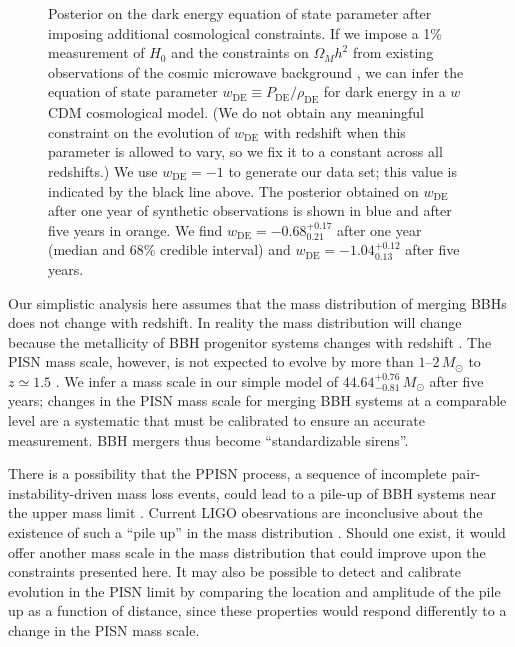 \documentclass[modern]{aastex62}
\newcommand{\wDE}{w_\mathrm{DE}}
\newcommand{\MScaleFiveYear}{44.64^{+0.76}_{-0.81} \, \MSun{}}
\newcommand{\wDEOneYear}{-0.68^{+0.17}_{0.21}}
\newcommand{\wDEFiveYear}{-1.04^{+0.12}_{0.13}}
\newcommand{\MSun}{M_\odot}
\begin{document}
\begin{figure}
%
  \caption{\label{fig:wDE} Posterior on the dark energy equation of state
  parameter after imposing additional cosmological constraints.  If we impose a
  1\% measurement of $H_0$ \citep{Chen2017,Mortlock2018,2018PhRvD..98h3523D} and the constraints on
  $\Omega_M h^2$ from existing observations of the cosmic microwave background
  \citep{Planck2016}, we can infer the equation of state parameter $\wDE{}
  \equiv P_\mathrm{DE} / \rho_\mathrm{DE}$ for dark energy in a $w$CDM
  cosmological model.  (We do not obtain any meaningful constraint on the
  evolution of $\wDE{}$ with redshift when this parameter is allowed to vary, so
  we fix it to a constant across all redshifts.)  We use $\wDE{} = -1$ to
  generate our data set; this value is indicated by the black line above.  The
  posterior obtained on $\wDE{}$ after one year of synthetic observations is
  shown in blue and after five years in orange.  We find $\wDE{} =
  \wDEOneYear{}$ after one year (median and 68\% credible interval) and $\wDE{}
  = \wDEFiveYear{}$ after five years.}
%
\end{figure}

Our simplistic analysis here assumes that the mass distribution of merging
\acp{BBH} does not change with redshift.  In reality the mass distribution will
change because the metallicity of \ac{BBH} progenitor systems changes with
redshift \citep{Belczynski2016,Mapelli2017}.  The \ac{PISN} mass scale, however,
is not expected to evolve by more than $1$--$2\,\MSun{}$ to $z \simeq 1.5$
\citep{Belczynski2016,Mapelli2017}.  We infer a mass scale in our simple model
of $\MScaleFiveYear{}$ after five years; changes in the \ac{PISN} mass scale for
merging \ac{BBH} systems at a comparable level are a systematic that must be
calibrated to ensure an accurate measurement.  \ac{BBH} mergers thus become
``standardizable sirens''.

There is a possibility that the \ac{PPISN} process, a sequence of incomplete
pair-instability-driven mass loss events, could lead to a pile-up of \ac{BBH}
systems near the upper mass limit
\citep{Belczynski2016,Marchant2018,Talbot2018}.  Current LIGO obesrvations are
inconclusive about the existence of such a ``pile up'' in the mass distribution
\citep{O1O2Population}.  Should one exist, it would offer another mass scale in
the mass distribution that could improve upon the constraints presented here. It
may also be possible to detect and calibrate evolution in the \ac{PISN} limit by
comparing the location and amplitude of the pile up as a function of distance,
since these properties would respond differently to a change in the \ac{PISN}
mass scale.
\end{document}

